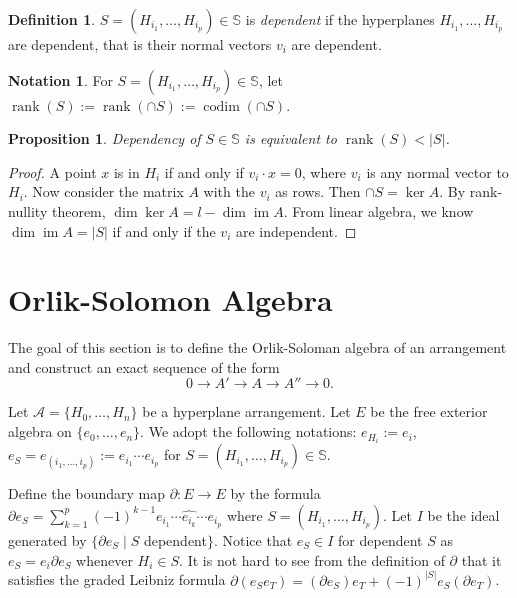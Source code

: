 \documentclass[article,twoside]{article}
\newcommand{\BB}[1]{\mathbb{#1}}
\newcommand{\script}[1]{\mathcal{#1}}
\newcommand{\im}{\operatorname{im}}
\newcommand{\codim}{\operatorname{codim}}
\newcommand{\rk}{\operatorname{rank}}
\newcommand{\tuples}{\BB{S}}
\theoremstyle{plain}
\theoremstyle{plain}
\theoremstyle{plain}
\newtheorem{proposition}[proposition]{Proposition}
\theoremstyle{plain}
\theoremstyle{plain}
\theoremstyle{definition}
\newtheorem{definition}[definition]{Definition}
\theoremstyle{definition}
\newtheorem{notation}[notation]{Notation}
\theoremstyle{definition}
\theoremstyle{remark}
\theoremstyle{remark}
\begin{document}
\begin{definition}
	$S=(H_{i_1},\dots,H_{i_p})\in \tuples$ is \emph{dependent} if the hyperplanes $H_{i_1},\dots,H_{i_p}$ are dependent, that is their normal vectors $v_i$ are dependent.
\end{definition}

\begin{notation}
	For $S=(H_{i_1},\dots,H_{i_p})\in \tuples$, let $\rk(S):=\rk(\cap S)  := \codim (\cap S)$.
\end{notation}

\begin{proposition}
	Dependency of $S\in \tuples$ is equivalent to $\rk(S)<|S|$.
\end{proposition}
\begin{proof}
	A point $x$ is in $H_i$ if and only if $v_i\cdot x=0$, where $v_i$ is any normal vector to $H_i$. Now consider the matrix $A$ with the $v_i$ as rows. Then $\cap S=\ker A$. By rank-nullity theorem, $\dim \ker A = l-\dim \im A$. From linear algebra, we know $\dim\im A=|S|$ if and only if the $v_i$ are independent.
\end{proof}





\section{Orlik-Solomon Algebra}

The goal of this section is to define the Orlik-Soloman algebra of an arrangement and construct an exact sequence of the form
$$
0\to A'\to A\to A''\to 0.
$$

Let $\script{A}=\{H_0,\dots,H_n\}$ be a hyperplane arrangement. Let $E$ be the free exterior algebra on $\{e_0,\dots,e_n\}$. We adopt the following notations: $e_{H_i}:=e_i$, $e_S=e_{(i_1,\dots,i_p)}:=e_{i_1}\cdots e_{i_p}$ for $S=(H_{i_1},\dots,H_{i_p})\in\tuples$.

Define the boundary map $\partial:E\to E$ by the formula $\partial e_S =  \sum_{k=1}^p(-1)^{k-1}e_{i_1}\cdots\hat{e_{i_k}}\cdots e_{i_p}$ where $S=(H_{i_1},\dots,H_{i_p})$. Let $I$ be the ideal generated by $\{\partial e_S \mid S$ dependent$\}$. Notice that $e_S\in I$ for dependent $S$ as $e_S = e_{i}\partial e_S$ whenever $H_{i}\in S$. It is not hard to see from the definition of $\partial$ that it satisfies the graded Leibniz formula $\partial (e_Se_T) = (\partial e_S)e_T+(-1)^{|S|} e_S(\partial e_T)$.
\end{document}
